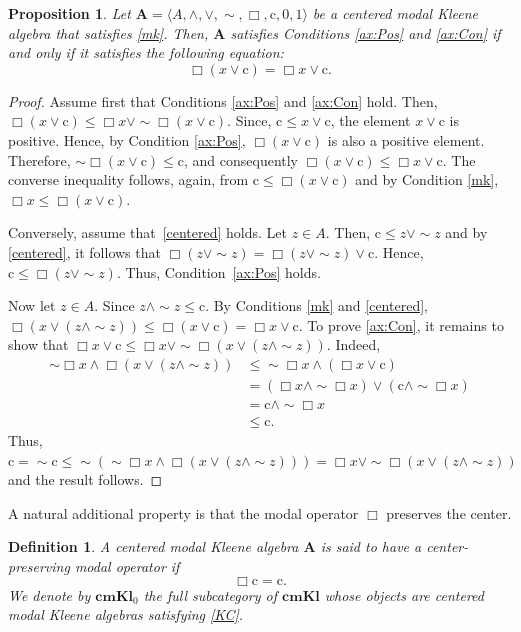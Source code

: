 \documentclass{article}
\newtheorem{proposition}[theorem]{Proposition}
\newtheorem{definition}[theorem]{Definition}
\newcommand{\cn}{\mathrm{c}}
\newcommand{\A}{\mathbf{A}}
\begin{document}
 \begin{proposition}
     Let $\mathbf{A}=\langle A,\wedge,\vee,\sim,\Box,\cn,0,1\rangle$ be a centered modal Kleene algebra that satisfies \eqref{mk}. Then, $\mathbf{A}$ satisfies Conditions \eqref{ax:Pos} and \eqref{ax:Con} if and only if it satisfies the following equation:
    \begin{equation}
        \Box(x\vee \cn)=\Box x\vee \cn.\tag{Cen}\label{centered}
    \end{equation} 
 \end{proposition}
 \begin{proof}
    Assume first that Conditions \eqref{ax:Pos} and \eqref{ax:Con} hold. Then, $\Box(x\vee \cn)\leq \Box x\vee \sim \Box(x\vee \cn)$. Since, $\cn \leq x\vee \cn$, the element $x\vee \cn$ is positive. Hence, by Condition \eqref{ax:Pos}, $\Box(x\vee \cn)$ is also a positive element. Therefore, $\sim \Box(x\vee \cn)\leq \cn$, and consequently $\Box(x\vee \cn)\leq \Box x\vee \cn$. The converse inequality follows, again, from $\cn\leq \Box(x\vee \cn)$ and by Condition \eqref{mk}, $\Box x\leq \Box(x\vee \cn)$.
 
     Conversely, assume that~\eqref{centered} holds. Let $z\in A$. Then, $\cn\leq z\vee\sim z$ and by \eqref{centered}, it follows that $\Box(z\vee\sim z)=\Box(z\vee\sim z)\vee \cn$. Hence, $\cn\leq \Box(z\vee\sim z)$. Thus, Condition~\eqref{ax:Pos} holds.

     Now let $z\in A$. Since $z\wedge\sim z\leq \cn$. By Conditions \eqref{mk} and \eqref{centered}, $\Box(x\vee (z\wedge \sim z))\leq \Box(x\vee \cn)=\Box x\vee \cn$. To prove \eqref{ax:Con}, it remains to show that $\Box x\vee \cn\leq \Box x\vee \sim \Box(x\vee(z\wedge\sim z))$. Indeed,
    \begin{align*}
       \sim\Box x \wedge  \Box(x\vee(z\wedge\sim z)) 
        &\le  \sim \Box x\wedge (\Box x\vee \cn)\\
        &=(\Box x\wedge\sim \Box x)\vee(\cn\wedge\sim \Box x)\\
        &=\cn\wedge\sim \Box x\\
        &\le \cn.
    \end{align*}
    Thus, $\cn=\sim \cn\leq \sim ( \sim\Box x\wedge \Box(x\vee(z\wedge\sim z)))=\Box x \vee \sim \Box(x\vee(z\wedge\sim z))$ and the result follows.
 \end{proof}

A natural additional property is that the modal operator $\Box$ preserves the center.

\begin{definition}
A centered modal Kleene algebra $\A$ is said to have a
\emph{center-preserving modal operator} if
\begin{equation}
\label{KC}\tag{KC}
\Box\cn=\cn.
\end{equation}
We denote by $\mathbf{cmKl}_0$ the full subcategory of $\mathbf{cmKl}$ whose objects are centered modal Kleene algebras satisfying \eqref{KC}.
\end{definition}
\end{document}
